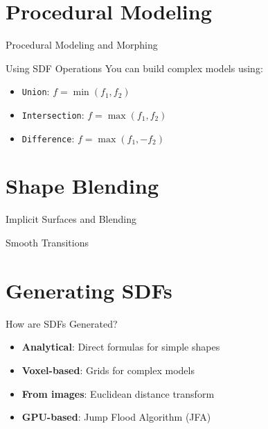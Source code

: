 \section{Procedural Modeling}
\begin{frame}{Procedural Modeling and Morphing}
  \begin{conceptbox}{Using SDF Operations}
    You can build complex models using:
    \begin{itemize}
      \item \texttt{Union}: $f = \min(f_1, f_2)$
      \item \texttt{Intersection}: $f = \max(f_1, f_2)$
      \item \texttt{Difference}: $f = \max(f_1, -f_2)$
    \end{itemize}
  \end{conceptbox}

  \vspace{0.3cm}
  \centering
  \resizebox{0.75\linewidth}{!}{}
\end{frame}

\section{Shape Blending}
\begin{frame}{Implicit Surfaces and Blending}
  \begin{conceptbox}{Smooth Transitions}
  \end{conceptbox}

  \vspace{0.3cm}
  \centering
\end{frame}




\section{Generating SDFs}
\begin{frame}{How are SDFs Generated?}
  \begin{itemize}
    \item \textbf{Analytical}: Direct formulas for simple shapes
    \item \textbf{Voxel-based}: Grids for complex models
    \item \textbf{From images}: Euclidean distance transform
    \item \textbf{GPU-based}: Jump Flood Algorithm (JFA)
  \end{itemize}
\end{frame}

